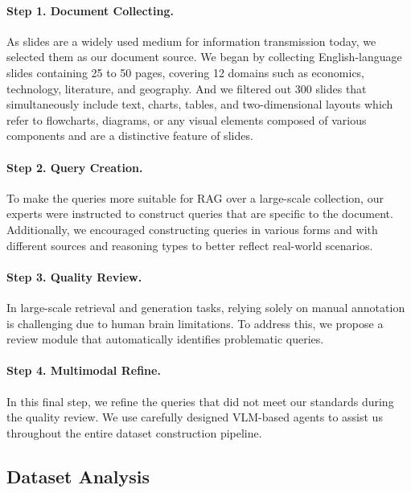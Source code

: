 \paragraph{Step 1. Document Collecting.}
As slides are a widely used medium for information transmission today, we selected them as our document source. We began by collecting English-language slides containing 25 to 50 pages, covering 12 domains such as economics, technology, literature, and geography. And we filtered out 300 slides that simultaneously include text, charts, tables, and two-dimensional layouts which refer to flowcharts, diagrams, or any visual elements composed of various components and are a distinctive feature of slides.


\paragraph{Step 2. Query Creation.}

To make the queries more suitable for RAG over a large-scale collection, our experts were instructed to construct queries that are specific to the document.
Additionally, we encouraged constructing queries in various forms and with different sources and reasoning types to better reflect real-world scenarios. 

\paragraph{Step 3. Quality Review.}

In large-scale retrieval and generation tasks, relying solely on manual annotation is challenging due to human brain limitations. To address this, we propose a review module that automatically identifies problematic queries.

\paragraph{Step 4. Multimodal Refine.}
In this final step, we refine the queries that did not meet our standards during the quality review. We use carefully designed VLM-based agents to assist us throughout the entire dataset construction pipeline. 


\subsection{Dataset Analysis}
\label{sec:data_analysis}

